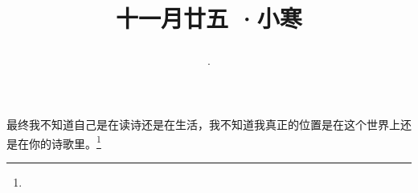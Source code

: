 \title{\date[d=6,m=1,y=2024][year:cn-y,年,month:cn,day:cn,日,·,weekday]·十一月廿五 ·小寒}
最终我不知道自己是在读诗还是在生活，我不知道我真正的位置是在这个世界上还是在你的诗歌里。\footnote{ }

